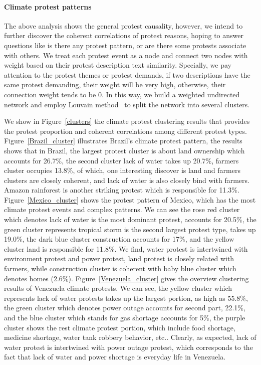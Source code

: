 \documentclass[9pt,twocolumn,twoside]{pnas-new}
\begin{document}
\paragraph{Climate protest patterns}
The above analysis shows the general protest causality, however, we intend to further discover the coherent correlations of protest reasons, hoping to answer questions like is there any protest pattern, or are there some protests associate with others. We treat each protest event as a node and connect two nodes with weight based on their protest description text similarity. Specially, we pay attention to the protest themes or protest demands, if two descriptions have the same protest demanding, their weight will be very high, otherwise, their connection weight tends to be 0. In this way, we build a weighted undirected network and  employ Louvain method~\cite{blondel2008fast} to split the network into several clusters.

We show in Figure~\ref{clusters} the climate protest clustering results that provides the protest proportion and coherent correlations among different protest types. Figure~\ref{Brazil_cluster} illustrates Brazil's climate protest pattern, the results shows that in Brazil, the largest protest cluster is about land ownership which accounts for 26.7\%, the second cluster lack of water takes up 20.7\%, farmers cluster occupies 13.8\%, of which, one interesting discover is land and farmers clusters are closely coherent, and lack of water is also closely bind with farmers. Amazon rainforest is another striking protest which is responsible for 11.3\%. Figure~\ref{Mexico_cluster} shows the protest pattern of Mexico, which has the most climate protest events and complex patterns. We can see the rose red cluster which denotes lack of water is the most dominant protest, accounts for 20.5\%, the green cluster represents tropical storm is the second largest protest type, takes up 19.0\%, the dark blue cluster construction accounts for 17\%, and the yellow cluster land is responsible for 11.8\%. We find, water protest is intertwined with environment protest and power protest, land protest is closely related with farmers, while construction cluster is coherent with baby blue cluster which denotes homes (2.6\%). Figure~\ref{Venezuela_cluster} gives the overview clustering results of Venezuela climate protests. We can see, the yellow cluster which represents lack of water protests takes up the largest portion, as high as 55.8\%, the green cluster which denotes power outage accounts for second part, 22.1\%, and the blue cluster which stands for gas shortage accounts for 5\%, the purple cluster shows the rest climate protest portion, which include food shortage, medicine shortage, water tank robbery behavior, etc.. Clearly, as expected, lack of water protest is intertwined with power outage protest, which corresponds to the fact that lack of water and power shortage is everyday life in Venezuela.
\end{document}
